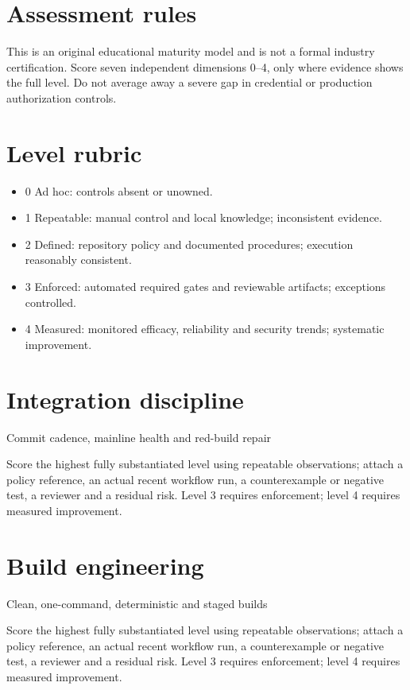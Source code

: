 \documentclass[11pt,letterpaper]{article}
\begin{document}
\makedoctitle
\makedocsummary
\tableofcontents
\clearpage
\section{Assessment rules}
This is an original educational maturity model and is not a formal industry certification. Score seven independent dimensions 0--4, only where evidence shows the full level. Do not average away a severe gap in credential or production authorization controls.

\section{Level rubric}
\begin{itemize}
\item 0 Ad hoc: controls absent or unowned.
\item 1 Repeatable: manual control and local knowledge; inconsistent evidence.
\item 2 Defined: repository policy and documented procedures; execution reasonably consistent.
\item 3 Enforced: automated required gates and reviewable artifacts; exceptions controlled.
\item 4 Measured: monitored efficacy, reliability and security trends; systematic improvement.
\end{itemize}
\section{Integration discipline}
Commit cadence, mainline health and red-build repair

Score the highest fully substantiated level using repeatable observations; attach a policy reference, an actual recent workflow run, a counterexample or negative test, a reviewer and a residual risk. Level 3 requires enforcement; level 4 requires measured improvement.

\section{Build engineering}
Clean, one-command, deterministic and staged builds

Score the highest fully substantiated level using repeatable observations; attach a policy reference, an actual recent workflow run, a counterexample or negative test, a reviewer and a residual risk. Level 3 requires enforcement; level 4 requires measured improvement.
\end{document}
